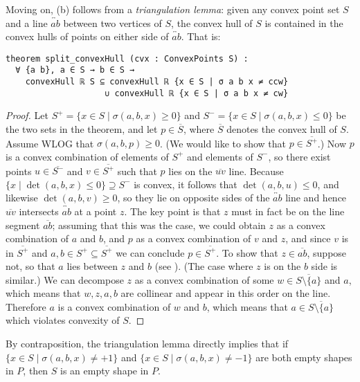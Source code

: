 Moving on, (b) follows from a \emph{triangulation lemma}:
given any convex point set $S$
and a line $\overleftrightarrow{ab}$ between two vertices of $S$,
the convex hull of $S$ is contained in the convex hulls
of points on either side of $\overleftrightarrow{ab}$.
That is:
\begin{lstlisting}
theorem split_convexHull (cvx : ConvexPoints S) :
  ∀ {a b}, a ∈ S → b ∈ S →
    convexHull ℝ S ⊆ convexHull ℝ {x ∈ S | σ a b x ≠ ccw}
                    ∪ convexHull ℝ {x ∈ S | σ a b x ≠ cw}
\end{lstlisting}

\begin{proof}
    Let $S^+=\{x\in S\mid \sigma(a,b,x)\ge 0\}$ and $S^-=\{x\in S\mid \sigma(a,b,x)\le 0\}$ be the two sets in the theorem, and let $p\in \overline{S}$, where $\overline{S}$ denotes the convex hull of $S$. Assume WLOG that $\sigma(a,b,p)\ge 0$. (We would like to show that $p\in \overline{S^+}$.) Now $p$ is a convex combination of elements of $S^+$ and elements of $S^-$, so there exist points $u\in \overline{S^-}$ and $v\in \overline{S^+}$ such that $p$ lies on the $\overline{uv}$ line.
%
    Because $\{x\mid \det(a,b,x)\le 0\}\supseteq S^-$ is convex, it follows that $\det(a,b,u)\le 0$, and likewise $\det(a,b,v)\ge 0$, so they lie on opposite sides of the $\overleftrightarrow{ab}$ line and hence $\overline{uv}$ intersects $\overleftrightarrow{ab}$ at a point $z$. The key point is that $z$ must in fact be on the line segment $\overline{ab}$; assuming that this was the case, we could obtain $z$ as a convex combination of $a$ and $b$, and $p$ as a convex combination of $v$ and $z$, and since $v$ is in $\overline{S^+}$ and $a,b\in S^+\subseteq\overline{S^+}$ we can conclude $p\in \overline{S^+}$.
%
    To show that $z\in \overline{ab}$, suppose not, so that $a$ lies between $z$ and $b$ (see ). (The case where $z$ is on the $b$ side is similar.) We can decompose $z$ as a convex combination of some $w\in \overline{S\setminus\{a\}}$ and $a$, which means that $w,z,a,b$ are collinear and appear in this order on the line. Therefore $a$ is a convex combination of $w$ and $b$, which means that $a\in \overline{S\setminus\{a\}}$ which violates convexity of $S$.
\end{proof}

\noindent
By contraposition,
the triangulation lemma directly implies that
if $\{x \in S \mid \sigma(a,b,x) \neq +1\}$ and $\{x \in S \mid \sigma(a,b,x) \neq -1\}$
are both empty shapes in $P$,
then $S$ is an empty shape in $P$.


